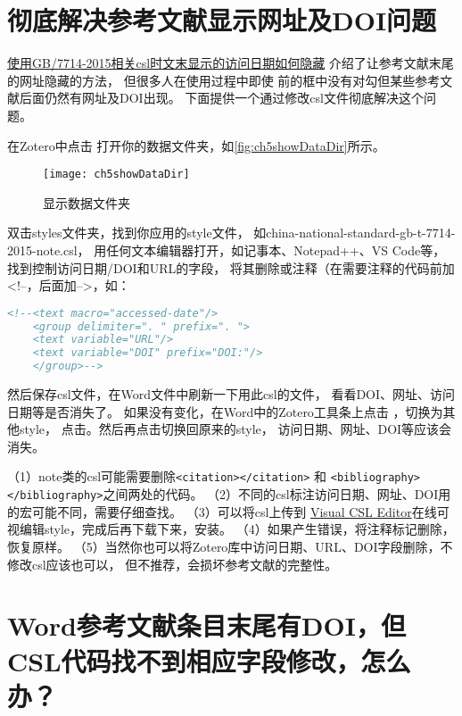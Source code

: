 \documentclass[theorem=false,mathfont=none,openany,sub3section]{easybook}
\begin{document}
{\section{彻底解决参考文献显示网址及DOI问题}\label{sec:remove_doi}

\href{https://zhuanlan.zhihu.com/p/349555378}
{使用GB/7714-2015相关csl时文末显示的访问日期如何隐藏}
介绍了让参考文献末尾的网址隐藏的方法，
但很多人在使用过程中即使
前的框中没有对勾但某些参考文献后面仍然有网址及DOI出现。
下面提供一个通过修改csl文件彻底解决这个问题。

在Zotero中点击
打开你的数据文件夹，如\autoref{fig:ch5showDataDir}所示。
\begin{figure}[htbp]
	\centering
	\texttt{[image: ch5showDataDir]}
	\caption{显示数据文件夹}
	\label{fig:ch5showDataDir}
\end{figure}
双击styles文件夹，找到你应用的style文件，
如china-national-standard-gb-t-7714-2015-note.csl，
用任何文本编辑器打开，如记事本、Notepad++、VS Code等，
找到控制访问日期/DOI和URL的字段，
将其删除或注释（在需要注释的代码前加<!--，后面加-->，如：

\begin{lstlisting}[language=HTML]
	<!--<text macro="accessed-date"/>
	<group delimiter=". " prefix=". ">
	<text variable="URL"/>
	<text variable="DOI" prefix="DOI:"/>
	</group>-->
\end{lstlisting}							
然后保存csl文件，在Word文件中刷新一下用此csl的文件，
看看DOI、网址、访问日期等是否消失了。
如果没有变化，在Word中的Zotero工具条上点击
，切换为其他style，
点击。然后再点击切换回原来的style，
访问日期、网址、DOI等应该会消失。

\begin{note}
	（1）note类的csl可能需要删除\verb|<citation></citation>|
	和 \verb|<bibliography></bibliography>|之间两处的代码。
	（2）不同的csl标注访问日期、网址、DOI用的宏可能不同，需要仔细查找。
	（3）可以将csl上传到	\href{http://editor.citationstyles.org/visualEditor/}{Visual CSL Editor}在线可视编辑style，完成后再下载下来，安装。
	（4）如果产生错误，将注释标记删除，恢复原样。
	（5）当然你也可以将Zotero库中访问日期、URL、DOI字段删除，不修改csl应该也可以，
	但不推荐，会损坏参考文献的完整性。
\end{note}

\section{Word参考文献条目末尾有DOI，但CSL代码找不到相应字段修改，怎么办？}\label{sec:no_doi}

}
\end{document}
